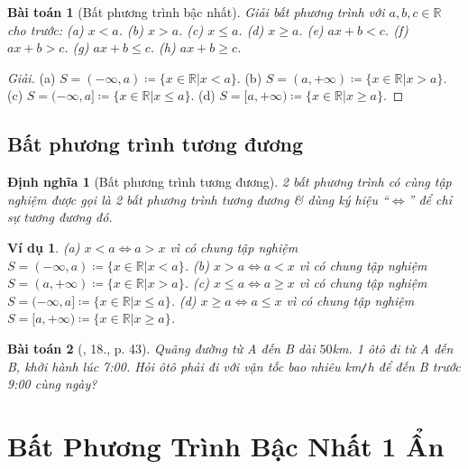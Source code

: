 \documentclass{article}
\newtheorem{baitoan}{Bài toán}
\newtheorem{dinhnghia}{Định nghĩa}
\newtheorem{vidu}{Ví dụ}
\begin{document}
\begin{baitoan}[Bất phương trình bậc nhất]
	Giải bất phương trình với $a,b,c\in\mathbb{R}$ cho trước: (a) $x < a$. (b) $x > a$. (c) $x\le a$. (d) $x\ge a$. (e) $ax + b < c$. (f) $ax + b > c$. (g) $ax + b\le c$. (h) $ax + b\ge c$.
\end{baitoan}

\begin{proof}[Giải]
	(a) $S = (-\infty,a)\coloneqq\{x\in\mathbb{R}|x < a\}$. (b) $S = (a,+\infty)\coloneqq\{x\in\mathbb{R}|x > a\}$. (c) $S = (-\infty,a]\coloneqq\{x\in\mathbb{R}|x\le a\}$. (d) $S = [a,+\infty)\coloneqq\{x\in\mathbb{R}|x\ge a\}$.
\end{proof}

\subsection{Bất phương trình tương đương}

\begin{dinhnghia}[Bất phương trình tương đương]
	2 bất phương trình có cùng tập nghiệm được gọi là \emph{2 bất phương trình tương đương} \& dùng ký hiệu ``$\Leftrightarrow$'' để chỉ sự tương đương đó.
\end{dinhnghia}

\begin{vidu}
	(a) $x < a\Leftrightarrow a > x$ vì có chung tập nghiệm $S = (-\infty,a)\coloneqq\{x\in\mathbb{R}|x < a\}$. (b) $x > a\Leftrightarrow a < x$ vì có chung tập nghiệm $S = (a,+\infty)\coloneqq\{x\in\mathbb{R}|x > a\}$. (c) $x\le a\Leftrightarrow a\ge x$ vì có chung tập nghiệm $S = (-\infty,a]\coloneqq\{x\in\mathbb{R}|x\le a\}$. (d) $x\ge a\Leftrightarrow a\le x$ vì có chung tập nghiệm $S = [a,+\infty)\coloneqq\{x\in\mathbb{R}|x\ge a\}$.
\end{vidu}

\begin{baitoan}[\cite{SGK_Toan_8_tap_2}, 18., p. 43]
	Quãng đường từ A đến B dài $50$\emph{km}. 1 ôtô đi từ A đến B, khởi hành lúc 7:00. Hỏi ôtô phải đi với vận tốc bao nhiêu \emph{km\texttt{/}h} để đến B trước 9:00 cùng ngày?
\end{baitoan}


\section{Bất Phương Trình Bậc Nhất 1 Ẩn}
\end{document}
